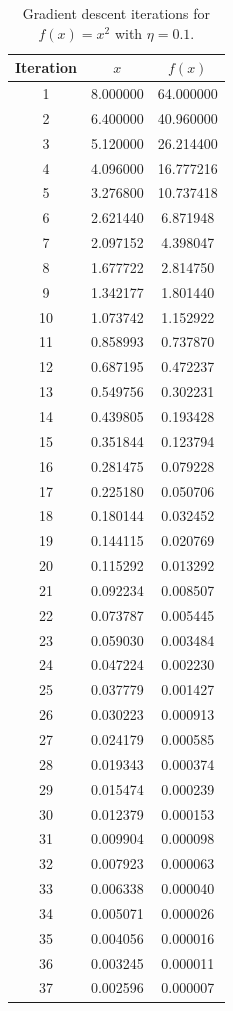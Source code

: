 \documentclass[conference]{IEEEtran}
\begin{document}
\begin{table}[h]
\caption{Gradient descent iterations for $f(x)=x^{2}$ with $\eta=0.1$.}
\label{tab:results}
\centering
\begin{tabular}{@{}ccc@{}}
\toprule
Iteration & $x$ & $f(x)$ \\
\midrule
1 & 8.000000 & 64.000000 \\
2 & 6.400000 & 40.960000 \\
3 & 5.120000 & 26.214400 \\
4 & 4.096000 & 16.777216 \\
5 & 3.276800 & 10.737418 \\
6 & 2.621440 & 6.871948 \\
7 & 2.097152 & 4.398047 \\
8 & 1.677722 & 2.814750 \\
9 & 1.342177 & 1.801440 \\
10 & 1.073742 & 1.152922 \\
11 & 0.858993 & 0.737870 \\
12 & 0.687195 & 0.472237 \\
13 & 0.549756 & 0.302231 \\
14 & 0.439805 & 0.193428 \\
15 & 0.351844 & 0.123794 \\
16 & 0.281475 & 0.079228 \\
17 & 0.225180 & 0.050706 \\
18 & 0.180144 & 0.032452 \\
19 & 0.144115 & 0.020769 \\
20 & 0.115292 & 0.013292 \\
21 & 0.092234 & 0.008507 \\
22 & 0.073787 & 0.005445 \\
23 & 0.059030 & 0.003484 \\
24 & 0.047224 & 0.002230 \\
25 & 0.037779 & 0.001427 \\
26 & 0.030223 & 0.000913 \\
27 & 0.024179 & 0.000585 \\
28 & 0.019343 & 0.000374 \\
29 & 0.015474 & 0.000239 \\
30 & 0.012379 & 0.000153 \\
31 & 0.009904 & 0.000098 \\
32 & 0.007923 & 0.000063 \\
33 & 0.006338 & 0.000040 \\
34 & 0.005071 & 0.000026 \\
35 & 0.004056 & 0.000016 \\
36 & 0.003245 & 0.000011 \\
37 & 0.002596 & 0.000007 \\
\bottomrule
\end{tabular}
\end{table}
\end{document}
